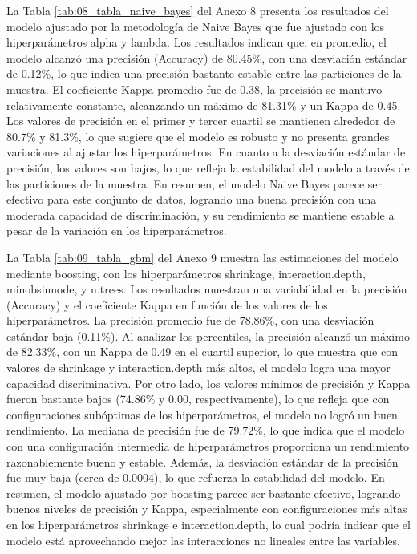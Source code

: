 \documentclass[12pt,a4paper,onecolumn]{article}
\begin{document}
La Tabla \ref{tab:08_tabla_naive_bayes} del Anexo 8 presenta los resultados del modelo ajustado por la metodología de Naive Bayes que fue ajustado con los hiperparámetros alpha y lambda. Los resultados indican que, en promedio, el modelo alcanzó una precisión (Accuracy) de 80.45\%, con una desviación estándar de 0.12\%, lo que indica una precisión bastante estable entre las particiones de la muestra. El coeficiente Kappa promedio fue de 0.38, la precisión se mantuvo relativamente constante, alcanzando un máximo de 81.31\% y un Kappa de 0.45. Los valores de precisión en el primer y tercer cuartil se mantienen alrededor de 80.7\% y 81.3\%, lo que sugiere que el modelo es robusto y no presenta grandes variaciones al ajustar los hiperparámetros. En cuanto a la desviación estándar de precisión, los valores son bajos, lo que refleja la estabilidad del modelo a través de las particiones de la muestra. En resumen, el modelo Naive Bayes parece ser efectivo para este conjunto de datos, logrando una buena precisión con una moderada capacidad de discriminación, y su rendimiento se mantiene estable a pesar de la variación en los hiperparámetros.

La Tabla \ref{tab:09_tabla_gbm} del Anexo 9 muestra las estimaciones del modelo mediante boosting, con los hiperparámetros shrinkage, interaction.depth, minobsinnode, y n.trees. Los resultados muestran una variabilidad en la precisión (Accuracy) y el coeficiente Kappa en función de los valores de los hiperparámetros. La precisión promedio fue de 78.86\%, con una desviación estándar baja (0.11\%). Al analizar los percentiles, la precisión alcanzó un máximo de 82.33\%, con un Kappa de 0.49 en el cuartil superior, lo que muestra que con valores de shrinkage y interaction.depth más altos, el modelo logra una mayor capacidad discriminativa. Por otro lado, los valores mínimos de precisión y Kappa fueron bastante bajos (74.86\% y 0.00, respectivamente), lo que refleja que con configuraciones subóptimas de los hiperparámetros, el modelo no logró un buen rendimiento. La mediana de precisión fue de 79.72\%, lo que indica que el modelo con una configuración intermedia de hiperparámetros proporciona un rendimiento razonablemente bueno y estable. Además, la desviación estándar de la precisión fue muy baja (cerca de 0.0004), lo que refuerza la estabilidad del modelo. En resumen, el modelo ajustado por boosting parece ser bastante efectivo, logrando buenos niveles de precisión y Kappa, especialmente con configuraciones más altas en los hiperparámetros shrinkage e interaction.depth, lo cual podría indicar que el modelo está aprovechando mejor las interacciones no lineales entre las variables.
\end{document}
